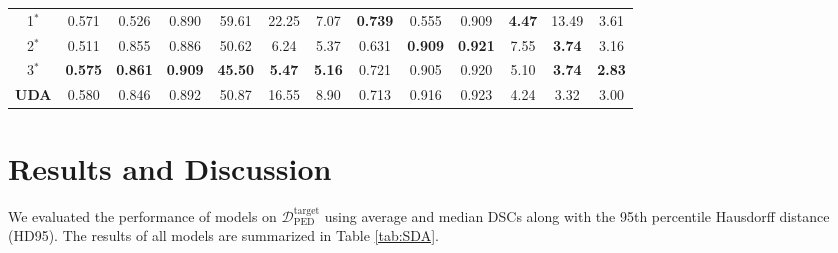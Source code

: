\documentclass[runningheads]{llncs}
\begin{document}
\begin{table}[t]
\begin{tabular}{cccc|ccc|ccc|ccc}
1$^*$                      & 0.571& 0.526& 0.890& 59.61& 22.25& 7.07&  \textbf{0.739}& 0.555& 0.909&  \textbf{4.47}& 13.49& 3.61\\
2$^*$                       & 0.511& 0.855& 0.886& 50.62& 6.24& 5.37& 0.631&  \textbf{0.909}&  \textbf{0.921}& 7.55&  \textbf{3.74}& 3.16\\
3$^*$                       &  \textbf{0.575}&  \textbf{0.861}&  \textbf{0.909}&  \textbf{45.50}&  \textbf{5.47}&  \textbf{5.16}& 0.721& 0.905& 0.920& 5.10&  \textbf{3.74}&  \textbf{2.83}\\ \hline
\textbf{UDA}             & 0.580& 0.846& 0.892& 50.87& 16.55& 8.90& 0.713& 0.916& 0.923& 4.24& 3.32& 3.00\\ \hline
\end{tabular}
\end{table}

\section{Results and Discussion}
We evaluated the performance of models on $\mathcal{D}_{\text{PED}}^{\text{target}}$ using average and median DSCs along with the 95th percentile Hausdorff distance (HD95).
The results of all models are summarized in Table \ref{tab:SDA}. %
\end{document}

